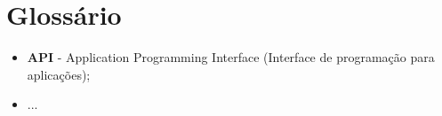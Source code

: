 \section{Glossário}

\noindent {}

\begin{itemize}

    \item \textbf{API} - Application Programming Interface (Interface de programação para aplicações);

    \item ...
    
\end{itemize}

